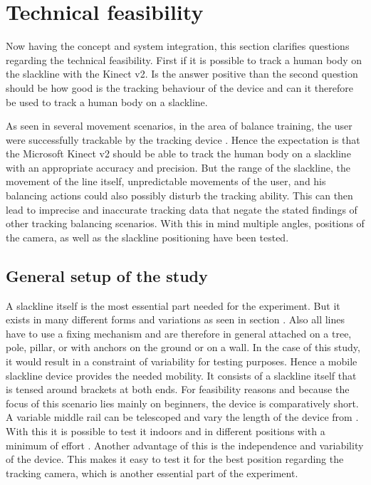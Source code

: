 \section{Technical feasibility}\label{5_3_technicalFeasibility}
Now having the concept and system integration, this section clarifies questions regarding the technical feasibility. First if it is possible to track a human body on the slackline with the Kinect v2. Is the answer positive than the second question should be how good is the tracking behaviour of the device and can it therefore be used to track a human body on a slackline.

As seen in several movement scenarios, in the area of balance training, the user were successfully trackable by the tracking device \textbf{\todo{[CITE]}}. Hence the expectation is that the Microsoft Kinect v2 should be able to track the human body on a slackline with an appropriate accuracy and precision. But the range of the slackline, the movement of the line itself, unpredictable movements of the user, and his balancing actions could also possibly disturb the tracking ability. This can then lead to imprecise and inaccurate tracking data that negate the stated findings of other tracking balancing scenarios. With this in mind multiple angles, positions of the camera, as well as the slackline positioning have been tested.

\subsection{General setup of the study} %
A slackline itself is the most essential part needed for the experiment. But it exists in many different forms and variations as seen in section \textit{}. Also all lines have to use a fixing mechanism and are therefore in general attached on a tree, pole, pillar, or with anchors on the ground or on a wall. In the case of this study, it would result in a constraint of variability for testing purposes. Hence a mobile slackline device provides the needed mobility. It consists of a slackline itself that is tensed around brackets at both ends. For feasibility reasons and because the focus of this scenario lies mainly on beginners, the device is comparatively short. A variable middle rail can be telescoped and vary the length of the device from \textbf{}. With this it is possible to test it indoors and in different positions with a minimum of effort \textbf{ }. Another advantage of this is the independence and variability of the device. This makes it easy to test it for the best position regarding the tracking camera, which is another essential part of the experiment.

